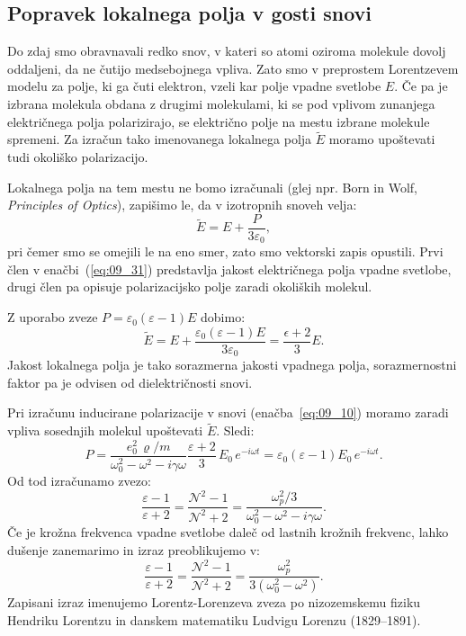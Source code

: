 \subsection*{Popravek lokalnega polja v gosti snovi}
Do zdaj smo obravnavali redko snov, v kateri so atomi oziroma molekule
dovolj oddaljeni, da ne čutijo medsebojnega vpliva. 
Zato smo v preprostem Lorentzevem modelu za polje, ki ga čuti elektron, 
vzeli kar polje vpadne svetlobe $E$. Če pa je izbrana molekula obdana
z drugimi molekulami, ki se pod vplivom zunanjega električnega polja 
polarizirajo, se  električno polje na mestu izbrane 
molekule spremeni. Za izračun tako imenovanega lokalnega polja $\tilde{E}$
moramo upoštevati tudi okoliško polarizacijo.

Lokalnega polja na tem mestu ne bomo izračunali (glej npr. Born in Wolf, {\it
Principles of Optics}), zapišimo le, da v izotropnih snoveh velja:
\begin{equation}
\tilde{E} = E + \frac{P}{3\varepsilon_0},
\label{eq:09_31}
\end{equation}
pri čemer smo se omejili le na eno smer, zato smo vektorski zapis opustili. 
Prvi člen v enačbi~(\ref{eq:09_31}) predstavlja jakost električnega 
polja vpadne svetlobe, drugi člen pa opisuje polarizacijsko 
polje zaradi okoliških molekul. 

Z uporabo zveze
$P = \varepsilon_0 (\varepsilon -1) E$ dobimo:
\begin{equation}
\tilde{E} = E + \frac{\varepsilon_0 (\varepsilon -1) E}{3\varepsilon_0} = 
\frac{\epsilon + 2}{3}E.
\label{eq:09_32}
\end{equation}
Jakost lokalnega polja je tako sorazmerna jakosti vpadnega polja, sorazmernostni
faktor pa je odvisen od dielektričnosti snovi.

Pri izračunu inducirane polarizacije v snovi (enačba~\ref{eq:09_10}) 
moramo zaradi vpliva sosednjih molekul upoštevati $\tilde{E}$. Sledi:
\begin{equation}
P = \frac{e_0^2\,\varrho/m}{\omega_0^2 - \omega^2 -i\gamma \omega}
\frac{\varepsilon+2}{3}\,E_0\,e^{-i\omega t}
= \varepsilon_0 (\varepsilon -1) E_0\,e^{-i\omega t}.
\label{eq:09_33}
\end{equation}
Od tod izračunamo zvezo:
\begin{equation}
\frac{\varepsilon -1 }{\varepsilon+2} = \frac{\mathcal{N}^2-1}{\mathcal{N}^2+2} = 
\frac{\omega_p^2/3}{\omega_0^2 - \omega^2 - i\gamma \omega}.
\label{eq:09_34}
\end{equation}
Če je krožna frekvenca vpadne svetlobe daleč od lastnih krožnih frekvenc, 
lahko dušenje zanemarimo in izraz preoblikujemo v:
\begin{equation}
\frac{\varepsilon -1 }{\varepsilon+2} = \frac{\mathcal{N}^2-1}{\mathcal{N}^2+2} = 
\frac{\omega_p^2}{3\left(\omega_0^2 - \omega^2\right)}.
\label{eq:09_35}
\end{equation}
Zapisani izraz imenujemo Lorentz-Lorenzeva zveza po nizozemskemu fiziku Hendriku Lorentzu
in danskem matematiku Ludvigu Lorenzu (1829--1891).

